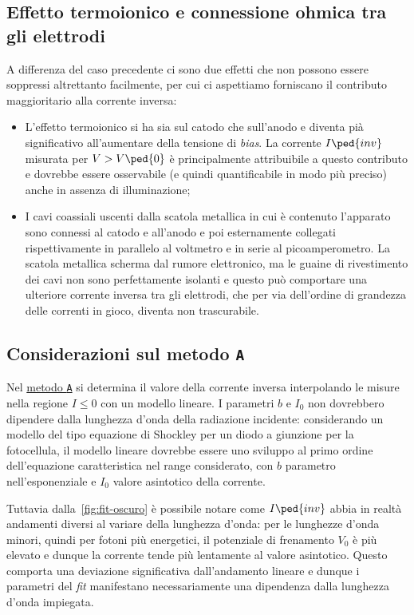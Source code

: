 \documentclass[10pt, a4paper, italian]{article}
\begin{document}
\subsection{Effetto termoionico e connessione ohmica tra gli elettrodi}
A differenza del caso precedente ci sono due effetti che non possono
essere soppressi altrettanto facilmente, per cui ci aspettiamo forniscano
il contributo maggioritario alla corrente inversa:
\begin{itemize}
    \item L'effetto termoionico si ha sia sul catodo che sull'anodo e diventa pià significativo all'aumentare della tensione di \emph{bias}. La corrente $ I\ped{inv} $ misurata per $ V > V\ped{0}$ è principalmente attribuibile a questo contributo e dovrebbe essere osservabile (e quindi quantificabile in modo più preciso) anche in assenza di illuminazione;

    \item I cavi coassiali uscenti dalla scatola metallica in cui è contenuto l'apparato sono connessi al catodo e all'anodo e poi esternamente collegati rispettivamente in parallelo al voltmetro e in serie al picoamperometro. La scatola metallica scherma dal rumore elettronico, ma le guaine di rivestimento dei cavi non sono perfettamente isolanti e questo può comportare una ulteriore corrente inversa tra gli elettrodi, che per via dell'ordine di grandezza delle correnti in gioco, diventa non trascurabile.
\end{itemize}

\subsection{Considerazioni sul metodo \texttt{A}}
Nel \hyperref[sec:metodoA]{metodo \texttt{A}} si determina il valore della corrente inversa interpolando le misure nella regione $I \leq 0 $ con un modello lineare. I parametri $ b $ e $ I_{0} $ non dovrebbero dipendere dalla lunghezza d'onda della radiazione incidente: considerando un modello del tipo equazione di Shockley per un diodo a giunzione per la fotocellula, il modello lineare dovrebbe essere uno sviluppo al primo ordine dell'equazione caratteristica nel range considerato, con $ b $ parametro nell'esponenziale e $ I_{0} $ valore asintotico della corrente.

Tuttavia dalla~\eqref{fig:fit-oscuro} è possibile notare come $ I\ped{inv} $ abbia in realtà andamenti diversi al variare della lunghezza d'onda: per le lunghezze d'onda minori, quindi per fotoni più energetici, il potenziale di frenamento $ V_{0} $ è più elevato e dunque la corrente tende più lentamente al valore asintotico. Questo comporta una deviazione significativa dall'andamento lineare e dunque i parametri del \emph{fit} manifestano necessariamente una dipendenza dalla lunghezza d'onda impiegata.
\end{document}
